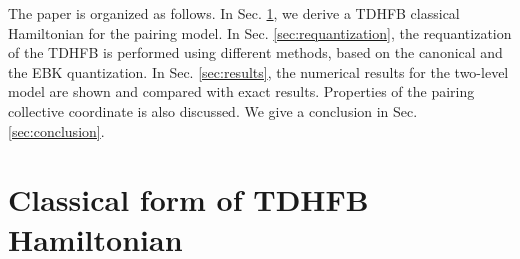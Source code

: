 \documentclass[%
superscriptaddress,
preprint,
showpacs,
nofootinbib,
amsmath,amssymb,
aps,
prc,
floatfix ]%
{revtex4-1}
\begin{document}

The paper is organized as follows. 
In Sec. \ref{sec:TDHFB},
we derive a TDHFB classical Hamiltonian for the pairing model.
In Sec. \ref{sec:requantization}, 
the requantization of the TDHFB is performed using different methods,
based on the canonical and the EBK quantization.
In Sec. \ref{sec:results}, 
the numerical results for the two-level model are shown and compared with
exact results.
Properties of the pairing collective coordinate is also discussed.
We give a conclusion in Sec. \ref{sec:conclusion}.


\section{Classical form of TDHFB Hamiltonian}
\label{sec:TDHFB}
\end{document}
